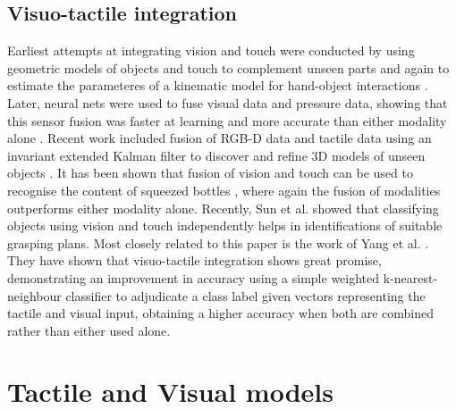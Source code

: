 \documentclass[letterpaper, 10 pt, conference]{ieeeconf}  %
\begin{document}
\subsection{Visuo-tactile integration}
Earliest attempts at integrating vision and touch were conducted by \cite{Allen1988} using geometric models of objects and touch to complement unseen parts and again to estimate the parameteres of a kinematic model for hand-object interactions \cite{Allen1999}.
Later, neural nets were used to fuse visual data and pressure data, showing that this sensor fusion was faster at learning and more accurate than either modality alone \cite{Kim2004}.
Recent work included fusion of RGB-D data and tactile data using an invariant extended Kalman filter to discover and refine 3D models of unseen objects \cite{Ilonen2013}.
It has been shown that fusion of vision and touch can be used to recognise the content of squeezed bottles \cite{Guler2014}, where again the fusion of modalities outperforms either modality alone.
Recently, Sun et al. \cite{Sun2016} showed that classifying objects using vision and touch independently helps in identifications of suitable grasping plans. 
Most closely related to this paper is the work of Yang et al. \cite{Yang2015}. They have shown that visuo-tactile integration shows great promise, demonstrating an improvement in accuracy using a simple weighted k-nearest-neighbour classifier to adjudicate a class label given vectors representing the tactile and visual input, obtaining a higher accuracy when both are combined rather than either used alone.

\section{Tactile and Visual models}
\end{document}
